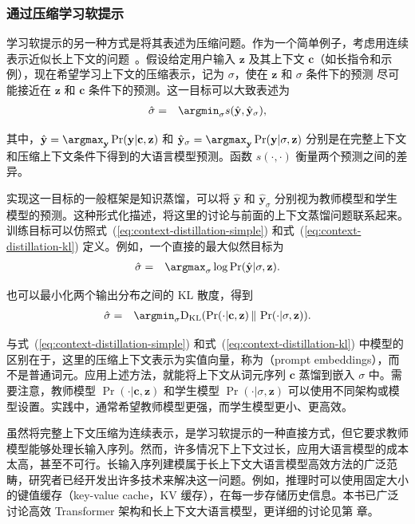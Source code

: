 \subsubsection{通过压缩学习软提示}

\noindent 学习软提示的另一种方式是将其表述为压缩问题。作为一个简单例子，考虑用连续表示近似长上下文的问题~\cite{wingate-etal:2022prompt}。假设给定用户输入 $\mathbf{z}$ 及其上下文 $\mathbf{c}$（如长指令和示例），现在希望学习上下文的压缩表示，记为 $\sigma$，使在 $\mathbf{z}$ 和 $\sigma$ 条件下的预测
尽可能接近在 $\mathbf{z}$ 和 $\mathbf{c}$ 条件下的预测。这一目标可以大致表述为
\begin{eqnarray}
\hat{\sigma} & = & \argmin_{\sigma} s(\hat{\mathbf{y}},\hat{\mathbf{y}}_{\sigma}),
\end{eqnarray}

\noindent 其中，$\hat{\mathbf{y}} = \argmax_{\mathbf{y}} \Pr(\mathbf{y}|\mathbf{c},\mathbf{z})$ 和 $\hat{\mathbf{y}}_{\sigma} = \argmax_{\mathbf{y}} \Pr(\mathbf{y}|\sigma,\mathbf{z})$ 分别是在完整上下文和压缩上下文条件下得到的大语言模型预测。函数 $s(\cdot,\cdot)$ 衡量两个预测之间的差异。

实现这一目标的一般框架是知识蒸馏，可以将 $\hat{\mathbf{y}}$ 和 $\hat{\mathbf{y}}_{\sigma}$ 分别视为教师模型和学生模型的预测。这种形式化描述，将这里的讨论与前面的上下文蒸馏问题联系起来。训练目标可以仿照式~(\ref{eq:context-distillation-simple}) 和式~(\ref{eq:context-distillation-kl}) 定义。例如，一个直接的最大似然目标为
\begin{eqnarray}
\hat{\sigma} & = & \argmax_{\sigma} \log \Pr(\hat{\mathbf{y}}|\sigma, \mathbf{z}).
\end{eqnarray}

\noindent 也可以最小化两个输出分布之间的 KL 散度，得到
\begin{eqnarray}
\hat{\sigma} & = & \argmin_{\sigma} \mathrm{D}_{\mathrm{KL}}(\Pr(\cdot|\mathbf{c},\mathbf{z}) \,\|\, \Pr(\cdot|\sigma,\mathbf{z})).
\end{eqnarray}

\noindent 与式~(\ref{eq:context-distillation-simple}) 和式~(\ref{eq:context-distillation-kl}) 中模型的区别在于，这里的压缩上下文表示为实值向量，称为（prompt embeddings），而不是普通词元。应用上述方法，就能将上下文从词元序列 $\mathbf{c}$ 蒸馏到嵌入 $\sigma$ 中。需要注意，教师模型 $\Pr(\cdot|\mathbf{c},\mathbf{z})$ 和学生模型 $\Pr(\cdot|\sigma,\mathbf{z})$ 可以使用不同架构或模型设置。实践中，通常希望教师模型更强，而学生模型更小、更高效。

虽然将完整上下文压缩为连续表示，是学习软提示的一种直接方式，但它要求教师模型能够处理长输入序列。然而，许多情况下上下文过长，应用大语言模型的成本太高，甚至不可行。长输入序列建模属于长上下文大语言模型高效方法的广泛范畴，研究者已经开发出许多技术来解决这一问题。例如，推理时可以使用固定大小的键值缓存（key-value cache，KV 缓存），在每一步存储历史信息。本书已广泛讨论高效 Transformer 架构和长上下文大语言模型，更详细的讨论见第 \ChapterLLM 章。

